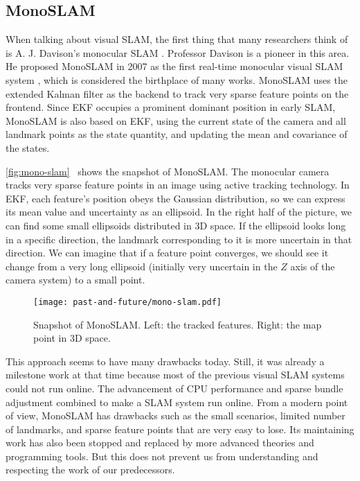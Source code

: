 \subsection{MonoSLAM}
When talking about visual SLAM, the first thing that many researchers think of is A. J. Davison's monocular SLAM {\cite{Davison2007,Davison2003}}. Professor Davison is a pioneer in this area. He proposed MonoSLAM in 2007 as the first real-time monocular visual SLAM system {\cite{Davison2007}}, which is considered the birthplace of many works. MonoSLAM uses the extended Kalman filter as the backend to track very sparse feature points on the frontend. Since EKF occupies a prominent dominant position in early SLAM, MonoSLAM is also based on EKF, using the current state of the camera and all landmark points as the state quantity, and updating the mean and covariance of the states.

\autoref{fig:mono-slam}~ shows the snapshot of MonoSLAM. The monocular camera tracks very sparse feature points in an image using active tracking technology. In EKF, each feature's position obeys the Gaussian distribution, so we can express its mean value and uncertainty as an ellipsoid. In the right half of the picture, we can find some small ellipsoids distributed in 3D space. If the ellipsoid looks long in a specific direction, the landmark corresponding to it is more uncertain in that direction. We can imagine that if a feature point converges, we should see it change from a very long ellipsoid (initially very uncertain in the $Z$ axis of the camera system) to a small point.

\begin{figure}[!htp]
	\centering
	\texttt{[image: past-and-future/mono-slam.pdf]}
	\caption{Snapshot of MonoSLAM. Left: the tracked features. Right: the map point in 3D space.}
	\label{fig:mono-slam}
\end{figure}

This approach seems to have many drawbacks today. Still, it was already a milestone work at that time because most of the previous visual SLAM systems could not run online. The advancement of CPU performance and sparse bundle adjustment combined to make a SLAM system run online. From a modern point of view, MonoSLAM has drawbacks such as the small scenarios, limited number of landmarks, and sparse feature points that are very easy to lose. Its maintaining work has also been stopped and replaced by more advanced theories and programming tools. But this does not prevent us from understanding and respecting the work of our predecessors.

